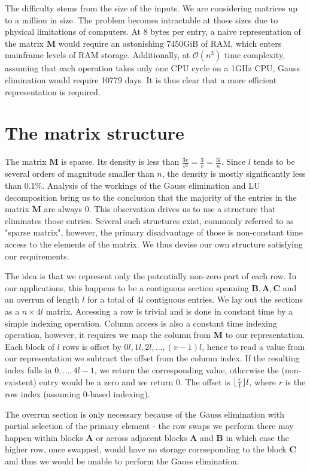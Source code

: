 \documentclass[12pt, a4paper]{article}
\newcommand{\bigO}{\mathcal{O}}
\DeclarePairedDelimiter{\floor}{\lfloor}{\rfloor}
\begin{document}
The difficulty stems from the size of the inputs. We are considering matrices up
to a million in size. The problem becomes intractable at those sizes due to
physical limitations of computers. At 8 bytes per entry, a naive representation
of the matrix $\bm{M}$ would require an astonishing 7450GiB of RAM, which enters
mainframe levels of RAM storage. Additionally, at $\bigO(n^3)$ time complexity,
assuming that each operation takes only one CPU cycle on a 1GHz CPU, Gauss
elimination would require 10779 days. It is thus clear that a more efficient
representation is required.

\section{The matrix structure}
The matrix $\bm{M}$ is sparse. Its density is less than $\frac{3v}{v^2} =
\frac{3}{v} = \frac{3l}{n}$. Since $l$ tends to be several orders of magnitude
smaller than $n$, the density is mostly significantly less than 0.1\%. Analysis
of the workings of the Gauss elimination and LU decomposition bring us to the
conclusion that the majority of the entries in the matrix $\bm{M}$ are always 0.
This observation drives us to use a structure that eliminates those entries.
Several such structures exist, commonly referred to as "sparse matrix", however,
the primary disadvantage of those is non-constant time access to the elements of
the matrix. We thus devise our own structure satisfying our requirements.

The idea is that we represent only the potentially non-zero part of each row. In
our applications, this happens to be a contiguous section spanning $\bm{B},
\bm{A}, \bm{C}$ and an overrun of length $l$ for a total of $4l$ contiguous
entries. We lay out the sections as a $n \times 4l$ matrix. Accessing a row is
trivial and is done in constant time by a simple indexing operation. Column
access is also a constant time indexing operation, however, it requires we map
the column from $\bm{M}$ to our representation. Each block of $l$ rows is offset
by $0l, 1l, 2l, ..., (v-1)l$, hence to read a value from our representation we
subtract the offset from the column index. If the resulting index falls in ${0,
..., 4l - 1}$, we return the corresponding value, otherwise the (non-existent)
entry would be a zero and we return 0. The offset is $\floor{\frac{r}{l}}l$,
where $r$ is the row index (assuming 0-based indexing).

The overrun section is only necessary because of the Gauss elimination with
partial selection of the primary element - the row swaps we perform there may
happen within blocks $\bm{A}$ or across adjacent blocks $\bm{A}$ and $\bm{B}$ in
which case the higher row, once swapped, would have no storage corrseponding to
the block $\bm{C}$ and thus we would be unable to perform the Gauss elimination.
\end{document}

